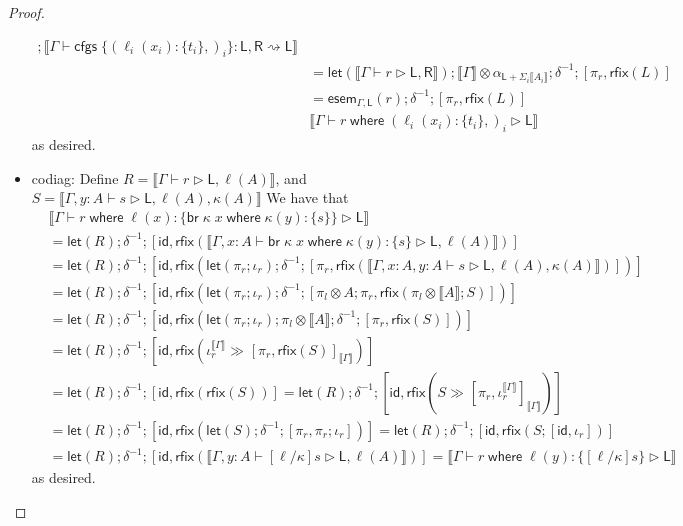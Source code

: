 \documentclass[acmsmall,screen,review]{acmart}
\newcommand{\ms}[1]{\ensuremath{\mathsf{#1}}}
\newcommand{\lto}{:}
\newcommand{\brb}[2]{\ms{br}\;#1\;#2}
\newcommand{\where}[2]{#1\;\ms{where}\;#2}
\newcommand{\wbranch}[3]{#1(#2) \lto \{#3\}}
\newcommand{\cfgsubst}[1]{\ms{cfgs}\;\{#1\}}
\newcommand{\bhyp}[2]{#1 : #2}
\newcommand{\haslb}[3]{#1 \vdash #2 \rhd #3}
\newcommand{\lbsubst}[4]{#1 \vdash #2: #3 \rightsquigarrow #4}
\newcommand{\brle}[1]{{\textsf{#1}}}
\newcommand{\dnt}[1]{\llbracket{#1}\rrbracket}
\newcommand{\entrymor}[3]{\ms{esem}_{#1, #3}(#2)}
\newcommand{\lmor}[1]{\ms{let}(#1)}
\newcommand{\rfix}[1]{\ms{rfix}(#1)}
\newcommand{\rseq}[3]{#2 \gg_{#1} #3}
\newcommand{\envcop}[3]{[#2, #3]_{#1}}
\newcommand{\envinr}[1]{\iota^{#1}_{r}}
\begin{document}
\begin{proof}
\begin{itemize}[leftmargin=*]
\begin{equation}
\begin{aligned}
          ; \dnt{
            \lbsubst{\Gamma}
              {\cfgsubst{(\wbranch{\ell_i}{x_i}{t_i},)_i}}{\ms{L}, \ms{R}}{\ms{L}}
          } \\
        & = \lmor{\dnt{\haslb{\Gamma}{r}{\ms{L}, \ms{R}}}}
          ; \dnt{\Gamma} \otimes \alpha_{\ms{L} + \Sigma_i\dnt{A_i}}; \delta^{-1} 
          ; [\pi_r, \rfix{L}] \\
        & = \entrymor{\Gamma}{r}{\ms{L}}; \delta^{-1} ; [\pi_r, \rfix{L}] \\
        & \dnt{\haslb{\Gamma}{\where{r}{(\wbranch{\ell_i}{x_i}{t_i},)_i}}{\ms{L}}}
      \end{aligned}
    \end{equation}
    as desired.
    \item \brle{codiag}: 
    Define $R = \dnt{\haslb{\Gamma}{r}{\ms{L}, \ell(A)}}$, and %
           $S = \dnt{\haslb{\Gamma, \bhyp{y}{A}}{s}{\ms{L}, \ell(A), \kappa(A)}}$ %
    We have that
    \begin{equation}
      \begin{aligned}
      & \dnt{\haslb{\Gamma}
        {\where{r}{\wbranch{\ell}{x}{\where{\brb{\kappa}{x}}{\wbranch{\kappa}{y}{s}}}}}{\ms{L}}} \\
      & = \lmor{R} ; \delta^{-1} ; [\ms{id}, 
        \rfix{\dnt{\haslb{\Gamma, \bhyp{x}{A}}
          {\where{\brb{\kappa}{x}}{\wbranch{\kappa}{y}{s}}}{\ms{L}, \ell(A)}}}] \\
      & = \lmor{R} ; \delta^{-1} ; [\ms{id}, 
        \rfix{\lmor{\pi_r ; \iota_r} ; \delta^{-1} 
            ; [\pi_r, 
            \rfix{\dnt{\haslb{\Gamma, \bhyp{x}{A}, \bhyp{y}{A}}{s}{\ms{L}, \ell(A), \kappa(A)}}}]
          }] \\
      & = \lmor{R} ; \delta^{-1} ; [\ms{id}, 
        \rfix{\lmor{\pi_r ; \iota_r} ; \delta^{-1} 
            ; [\pi_l \otimes A ; \pi_r, 
            \rfix{\pi_l \otimes \dnt{A} ; S}]
          }] \\
      & = \lmor{R} ; \delta^{-1} ; [\ms{id}, 
        \rfix{\lmor{\pi_r ; \iota_r} ; \pi_l \otimes \dnt{A} ; \delta^{-1} ; [\pi_r, \rfix{S}]
          }] \\
      & = \lmor{R} ; \delta^{-1} ; [\ms{id}, 
          \rfix{\rseq{}{\envinr{\dnt{\Gamma}}}{\envcop{\dnt{\Gamma}}{\pi_r}{\rfix{S}}}}] \\
      & = \lmor{R} ; \delta^{-1} ; [\ms{id}, \rfix{\rfix{S}}]
        = \lmor{R} ; \delta^{-1} ; 
          [\ms{id}, \rfix{\rseq{}{S}{\envcop{\dnt{\Gamma}}{\pi_r}{\envinr{\dnt{\Gamma}}}}}] \\
      & = \lmor{R} ; \delta^{-1} ; 
          [\ms{id}, \rfix{\lmor{S} ; \delta^{-1} ; [\pi_r, \pi_r ; \iota_r]}]
        = \lmor{R} ; \delta^{-1} ; 
          [\ms{id}, \rfix{S ; [\ms{id}, \iota_r]}] \\
      & = \lmor{R} ; \delta^{-1} ; 
      [\ms{id}, \rfix{\dnt{\haslb{\Gamma, \bhyp{y}{A}}{[\ell/\kappa]s}{\ms{L}, \ell(A)}}}]
        = \dnt{\haslb{\Gamma}{\where{r}{\wbranch{\ell}{y}{[\ell/\kappa]s}}}{\ms{L}}}
      \end{aligned}
    \end{equation}
    as desired.


\end{itemize}
\end{proof}
\end{document}
